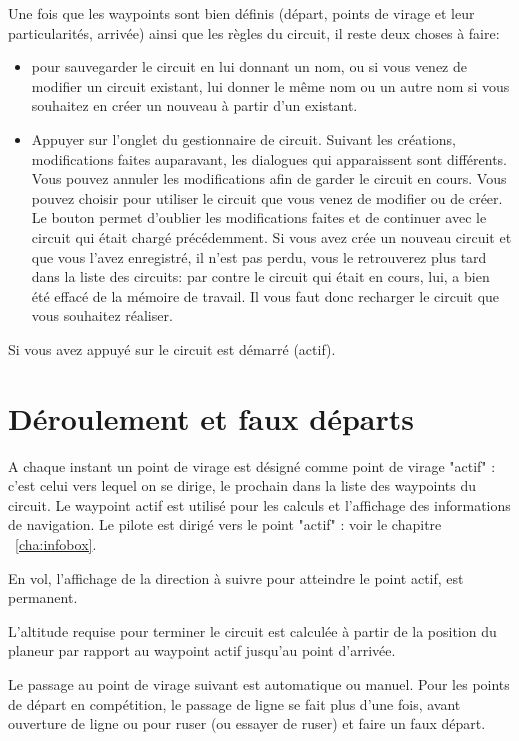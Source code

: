 Une fois que les waypoints sont bien définis (départ, points de virage et leur particularités, arrivée) ainsi que les règles du circuit, il reste deux choses à faire:
\begin{itemize}
\item  {} pour sauvegarder le circuit en lui donnant un nom, ou si vous venez de modifier un circuit existant, lui donner le même nom ou un autre nom si vous souhaitez en créer un nouveau à partir d'un existant.
\item Appuyer sur l'onglet   du gestionnaire de circuit. Suivant les créations, modifications faites auparavant, les dialogues qui apparaissent sont différents. Vous pouvez annuler les modifications afin de garder le circuit en cours. Vous pouvez choisir   pour utiliser le circuit que vous venez de modifier ou de créer. Le bouton   permet d'oublier les modifications faites et de continuer avec le circuit qui était chargé précédemment. Si vous avez crée un nouveau circuit et que vous l'avez enregistré, il n'est pas perdu, vous le retrouverez plus tard dans la liste des circuits: par contre le circuit qui était en cours, lui, a bien été effacé de la mémoire de travail. Il vous faut donc recharger le circuit que vous souhaitez réaliser.
 \end{itemize}

Si vous avez appuyé sur   le circuit est démarré (actif).

\section{Déroulement et faux départs}\label{sec:advanc-rest-tasks}
A chaque instant un point de virage est désigné comme point de virage "actif" : c'est celui vers lequel on se dirige, le prochain dans la liste des waypoints du circuit. Le waypoint actif est utilisé pour les calculs et l'affichage des informations de navigation. Le pilote est dirigé vers le point "actif" : voir le chapitre ~\ref{cha:infobox}.

En vol, l'affichage de la direction à suivre pour atteindre le point actif, est permanent.

L'altitude requise pour terminer le circuit est calculée à partir de la position du planeur par rapport au waypoint actif jusqu'au point d'arrivée.

Le passage au point de virage suivant est automatique ou manuel.
Pour les points de départ en compétition, le passage de ligne se fait plus d'une fois, avant ouverture de ligne ou pour ruser (ou essayer de ruser) et faire un faux départ.

